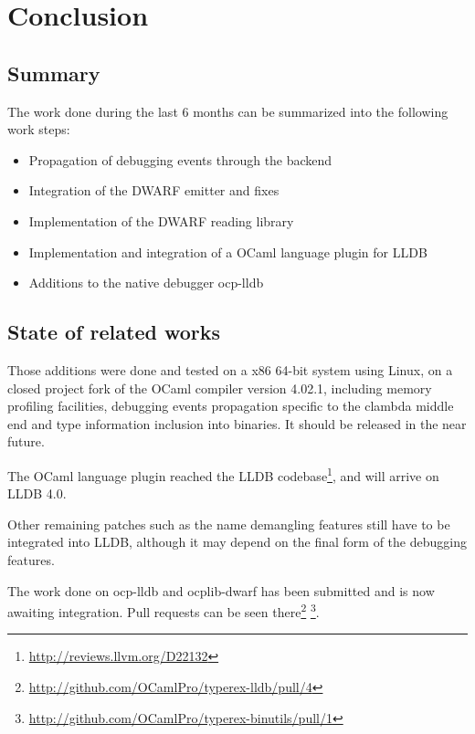 \chapter{Conclusion\label{cha:chapter5}}

\section{Summary\label{sec:summary}}

\noindent The work done during the last 6 months can be summarized into the following work steps:

\begin{itemize}
		\item Propagation of debugging events through the backend
		\vspace{-0.11in}
		\item Integration of the DWARF emitter and fixes
		\vspace{-0.11in}
		\item Implementation of the DWARF reading library
		\vspace{-0.11in}
		\item Implementation and integration of a OCaml language plugin for LLDB
		\vspace{-0.11in}
		\item Additions to the native debugger ocp-lldb
\end{itemize}

\section{State of related works\label{sec:outlook}}

Those additions were done and tested on a x86 64-bit system using Linux, on a
closed project fork of the OCaml compiler version 4.02.1, including memory
profiling facilities, debugging events propagation specific to the clambda
middle end and type information inclusion into binaries.
It should be released in the near future.

The OCaml language plugin reached the LLDB
codebase\footnote{\url{http://reviews.llvm.org/D22132}}, and will arrive on LLDB
4.0.

Other remaining patches such as the name demangling features
still have to be integrated into LLDB, although it
may depend on the final form of the debugging features.

The work done on ocp-lldb and ocplib-dwarf has been submitted and is now
awaiting integration.
Pull requests can be seen
there\footnote{\url{http://github.com/OCamlPro/typerex-lldb/pull/4}}
\footnote{\url{http://github.com/OCamlPro/typerex-binutils/pull/1}}.

